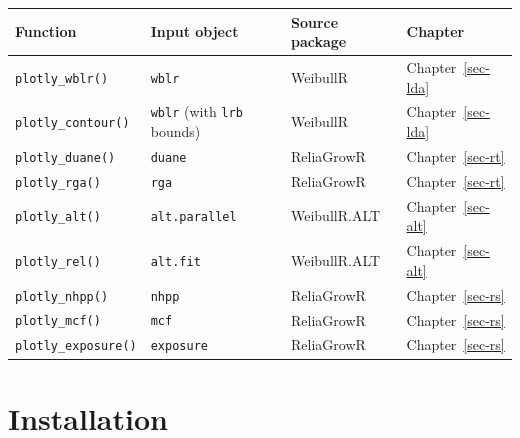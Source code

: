 \documentclass[
  letterpaper,
  DIV=11,
  numbers=noendperiod]{scrreprt}
\newcounter{none} %
\begin{document}
{\def\LTcaptype{none} %
\begin{longtable}[]{@{}
  >{\raggedright\arraybackslash}p{}
  >{\raggedright\arraybackslash}p{}
  >{\raggedright\arraybackslash}p{}
  >{\centering\arraybackslash}p{}@{}}
\toprule\noalign{}
\begin{minipage}[b]{\linewidth}\raggedright
Function
\end{minipage} & \begin{minipage}[b]{\linewidth}\raggedright
Input object
\end{minipage} & \begin{minipage}[b]{\linewidth}\raggedright
Source package
\end{minipage} & \begin{minipage}[b]{\linewidth}\centering
Chapter
\end{minipage} \\
\midrule\noalign{}
\endhead
\bottomrule\noalign{}
\endlastfoot
\texttt{plotly\_wblr()} & \texttt{wblr} & WeibullR &
Chapter~\ref{sec-lda} \\
\texttt{plotly\_contour()} & \texttt{wblr} (with \texttt{lrb} bounds) &
WeibullR & Chapter~\ref{sec-lda} \\
\texttt{plotly\_duane()} & \texttt{duane} & ReliaGrowR &
Chapter~\ref{sec-rt} \\
\texttt{plotly\_rga()} & \texttt{rga} & ReliaGrowR &
Chapter~\ref{sec-rt} \\
\texttt{plotly\_alt()} & \texttt{alt.parallel} & WeibullR.ALT &
Chapter~\ref{sec-alt} \\
\texttt{plotly\_rel()} & \texttt{alt.fit} & WeibullR.ALT &
Chapter~\ref{sec-alt} \\
\texttt{plotly\_nhpp()} & \texttt{nhpp} & ReliaGrowR &
Chapter~\ref{sec-rs} \\
\texttt{plotly\_mcf()} & \texttt{mcf} & ReliaGrowR &
Chapter~\ref{sec-rs} \\
\texttt{plotly\_exposure()} & \texttt{exposure} & ReliaGrowR &
Chapter~\ref{sec-rs} \\
\end{longtable}
}

\section{Installation}\label{installation-1}
\end{document}
